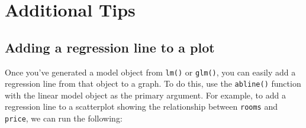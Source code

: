 \documentclass{tufte-book}\usepackage[]{graphicx}\usepackage[]{color}
\begin{document}
\section{Additional Tips}

\subsection{Adding a regression line to a plot}

Once you've generated a model object from \texttt{lm()} or \texttt{glm()}, you can easily add a regression line from that object to a graph. To do this, use the \texttt{abline()} function with the linear model object as the primary argument. For example, to add a regression line to a scatterplot showing the relationship between \texttt{rooms} and \texttt{price}, we can run the following:
\end{document}

